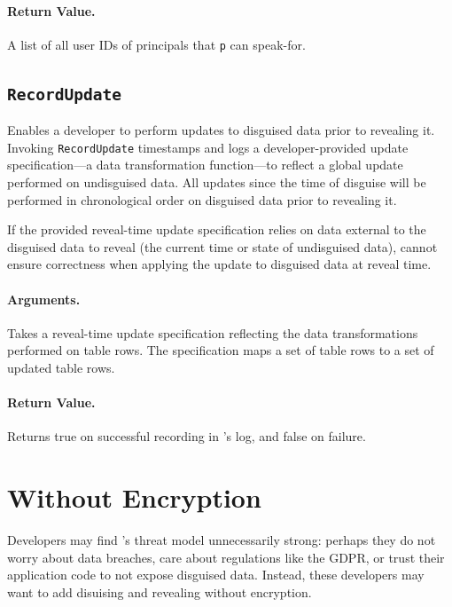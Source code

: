     \paragraph{Return Value.} 
    A list of all user IDs of principals that \texttt{p} can
    speak-for.

\subsection{\texttt{RecordUpdate}}
\label{s:semantics:updates}

Enables a developer to perform updates to disguised data prior to revealing it.
Invoking \texttt{RecordUpdate} timestamps and logs a developer-provided update
specification---a data transformation function---to reflect a global update
performed on undisguised data. All updates since the time of disguise will be
performed in chronological order on disguised data prior to revealing it.

If the provided reveal-time update specification relies on data external to the
disguised data to reveal (\eg the current time or state of undisguised data),
\sys cannot ensure correctness when applying the update to disguised data at
reveal time.

    \paragraph{Arguments.} Takes a reveal-time update specification reflecting
    the data transformations performed on table rows. The specification maps a
    set of table rows to a set of updated table rows.

    \paragraph{Return Value.} Returns true on successful recording in \sys's
    log, and false on failure.

\section{\sys Without Encryption}
\label{s:semantics:noencrypt}

Developers may find \sys's threat model unnecessarily strong: perhaps they do
not worry about data breaches, care about regulations like the GDPR, or trust
their application code to not expose disguised data. Instead, these developers
may want to add disuising and revealing without encryption.
%


